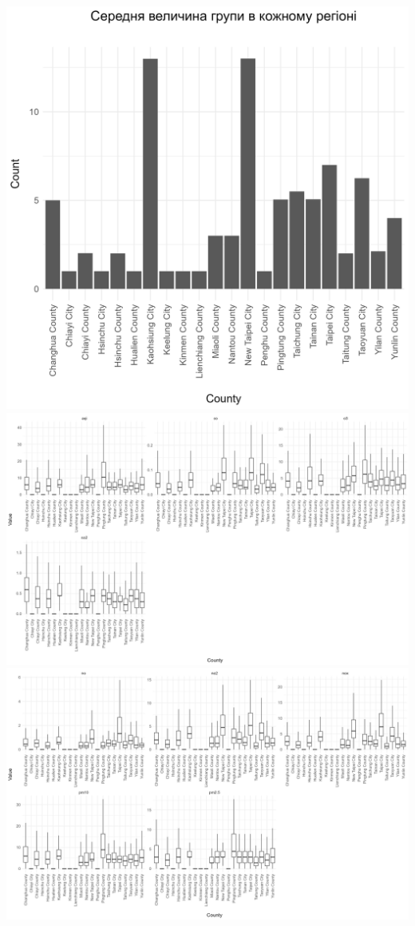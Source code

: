 \documentclass{article}
\begin{document}
\begin{enumerate}
    \begin{center}
    \includegraphics[width=6in]{plots/question7/bar-count.png}
    \includegraphics[width=6in]{plots/question7/box-county-p1.png}
    \includegraphics[width=6in]{plots/question7/box-county-p2.png}

\end{center}
\end{enumerate}
\end{document}
